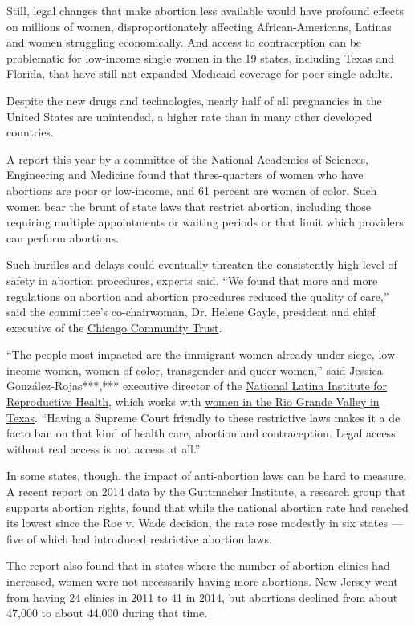 Still, legal changes that make abortion less available would have
profound effects on millions of women, disproportionately affecting
African-Americans, Latinas and women struggling economically. And access
to contraception can be problematic for low-income single women in the
19 states, including Texas and Florida, that have still not expanded
Medicaid coverage for poor single adults.

Despite the new drugs and technologies, nearly half of all pregnancies
in the United States are unintended, a higher rate than in many other
developed countries.

A report this year by a committee of the National Academies of Sciences,
Engineering and Medicine found that three-quarters of women who have
abortions are poor or low-income, and 61 percent are women of color.
Such women bear the brunt of state laws that restrict abortion,
including those requiring multiple appointments or waiting periods or
that limit which providers can perform abortions.

Such hurdles and delays could eventually threaten the consistently high
level of safety in abortion procedures, experts said. ``We found that
more and more regulations on abortion and abortion procedures reduced
the quality of care,'' said the committee's co-chairwoman, Dr. Helene
Gayle, president and chief executive of the
\href{http://cct.org/}{Chicago Community Trust}.

``The people most impacted are the immigrant women already under siege,
low-income women, women of color, transgender and queer women,'' said
Jessica González-Rojas***,*** executive director of the
\href{http://www.latinainstitute.org/}{National Latina Institute for
Reproductive Health}, which works with
\href{https://www.nuestrotexas.org/}{women in the Rio Grande Valley in
Texas}. ``Having a Supreme Court friendly to these restrictive laws
makes it a de facto ban on that kind of health care, abortion and
contraception. Legal access without real access is not access at all.''

In some states, though, the impact of anti-abortion laws can be hard to
measure. A recent report on 2014 data by the Guttmacher Institute, a
research group that supports abortion rights, found that while the
national abortion rate had reached its lowest since the Roe v. Wade
decision, the rate rose modestly in six states --- five of which had
introduced restrictive abortion laws.

The report also found that in states where the number of abortion
clinics had increased, women were not necessarily having more abortions.
New Jersey went from having 24 clinics in 2011 to 41 in 2014, but
abortions declined from about 47,000 to about 44,000 during that time.

